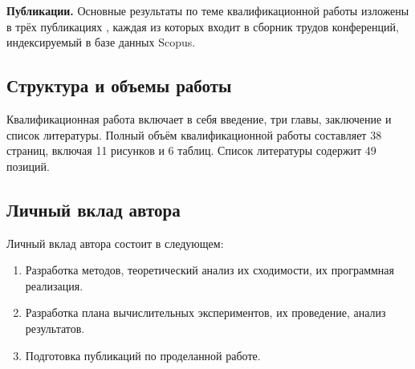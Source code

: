 \textbf{Публикации.} Основные результаты по теме квалификационной работы изложены в трёх публикациях \cite{barkalovSovraov2019,sovrasov2019,sovrasov2020},
каждая из которых входит в сборник трудов конференций, индексируемый в базе данных Scopus.

\subsection*{Структура и объемы работы}

Квалификационная работа включает в себя введение, три главы, заключение и список литературы.
Полный объём квалификационной работы составляет 38 страниц, включая 11 рисунков и 6 таблиц.
Список литературы содержит 49 позиций.

\subsection*{Личный вклад автора}

Личный вклад автора состоит в следующем:

\begin{enumerate}
    \item Разработка методов, теоретический анализ их сходимости, их программная реализация.
    \item Разработка плана вычислительных экспериментов, их проведение, анализ результатов.
    \item Подготовка публикаций по проделанной работе.
\end{enumerate}
